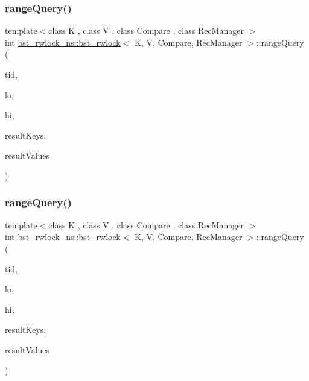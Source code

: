 \subsubsection{\texorpdfstring{range\+Query()}{rangeQuery()}\hspace{0.1cm}{\footnotesize\ttfamily [1/2]}}
{\footnotesize\ttfamily template$<$class K , class V , class Compare , class Rec\+Manager $>$ \\
int \hyperlink{classbst__rwlock__ns_1_1bst__rwlock}{bst\+\_\+rwlock\+\_\+ns\+::bst\+\_\+rwlock}$<$ K, V, Compare, Rec\+Manager $>$\+::range\+Query (\begin{DoxyParamCaption}\item[{const int}]{tid,  }\item[{const K \&}]{lo,  }\item[{const K \&}]{hi,  }\item[{K $\ast$const}]{result\+Keys,  }\item[{V $\ast$const}]{result\+Values }\end{DoxyParamCaption})\hspace{0.3cm}{\ttfamily [inline]}}

\mbox{\label{classbst__rwlock__ns_1_1bst__rwlock_a6ae6dae5dfb3dc230566bb5be9b9196b}} 
\subsubsection{\texorpdfstring{range\+Query()}{rangeQuery()}\hspace{0.1cm}{\footnotesize\ttfamily [2/2]}}
{\footnotesize\ttfamily template$<$class K , class V , class Compare , class Rec\+Manager $>$ \\
int \hyperlink{classbst__rwlock__ns_1_1bst__rwlock}{bst\+\_\+rwlock\+\_\+ns\+::bst\+\_\+rwlock}$<$ K, V, Compare, Rec\+Manager $>$\+::range\+Query (\begin{DoxyParamCaption}\item[{const int}]{tid,  }\item[{const K \&}]{lo,  }\item[{const K \&}]{hi,  }\item[{K $\ast$const}]{result\+Keys,  }\item[{V $\ast$const}]{result\+Values }\end{DoxyParamCaption})\hspace{0.3cm}{\ttfamily [inline]}}



